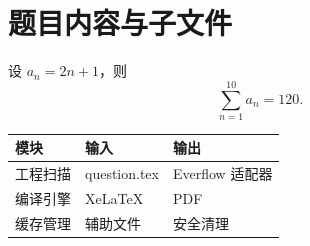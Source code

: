 \section*{题目内容与子文件}
设 $a_n=2n+1$，则
\[
  \sum_{n=1}^{10} a_n = 120.
\]

\begin{center}
\begin{tabular}{lll}
\toprule
模块 & 输入 & 输出\\
\midrule
工程扫描 & question.tex & Everflow 适配器\\
编译引擎 & XeLaTeX & PDF\\
缓存管理 & 辅助文件 & 安全清理\\
\bottomrule
\end{tabular}
\end{center}
